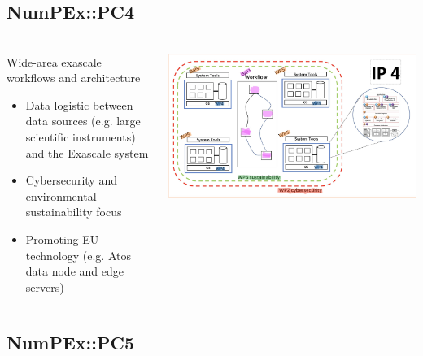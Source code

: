 \subsection{NumPEx::PC4}

\begin{frame}
  \frametitle{\insertsectionhead}
  \framesubtitle{\insertsubsectionhead}

  \begin{columns}
    \begin{column}{0.5\textwidth}
      \begin{alertblock}{Wide-area exascale workflows and
        architecture}
        \begin{itemize}
          \item Data logistic between data sources
          (e.g. large scientific instruments) and
          the Exascale system
          \item Cybersecurity and environmental
          sustainability focus
          \item Promoting EU technology (e.g. Atos
          data node and edge servers)
        \end{itemize}
      \end{alertblock}
      
    \end{column}
    \begin{column}{.5\textwidth}
      \includegraphics[width=\textwidth]{../figures/numpex-ip4.png}
    \end{column}
  \end{columns}

\end{frame}


\subsection{NumPEx::PC5}

